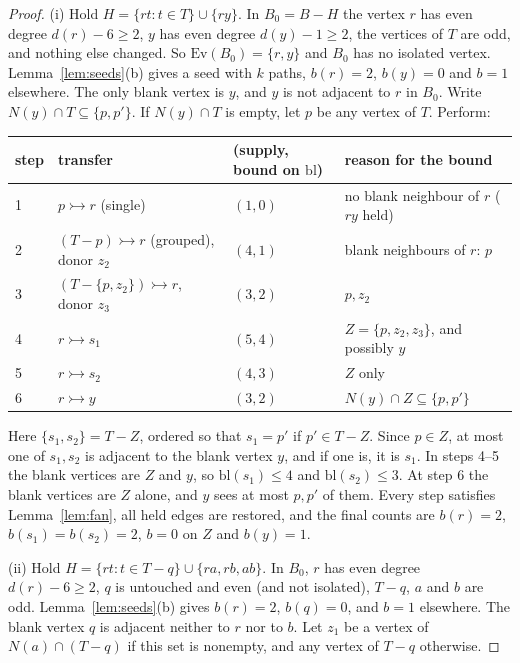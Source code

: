 \documentclass[11pt]{amsart}
\theoremstyle{definition}
\newcommand{\Ev}{\mathrm{Ev}}
\newcommand{\tr}{\rightarrowtail}   %
\newcommand{\bl}{\mathrm{bl}}
\begin{document}
\begin{proof}
(i) Hold $H=\{rt:t\in T\}\cup\{ry\}$. In $B_0=B-H$ the vertex $r$ has even degree $d(r)-6\ge2$, $y$
has even degree $d(y)-1\ge2$, the vertices of $T$ are odd, and nothing else changed. So
$\Ev(B_0)=\{r,y\}$ and $B_0$ has no isolated vertex. Lemma~\ref{lem:seeds}(b) gives a seed with
$k$ paths, $b(r)=2$, $b(y)=0$ and $b=1$ elsewhere. The only blank vertex is $y$, and $y$ is not
adjacent to $r$ in $B_0$. Write $N(y)\cap T\subseteq\{p,p'\}$. If $N(y)\cap T$ is empty, let $p$ be
any vertex of $T$. Perform:

\begin{center}\small
\begin{tabular}{llll}
\toprule
step & transfer & (supply, bound on $\bl$) & reason for the bound\\
\midrule
1 & $p\tr r$ (single) & $(1,0)$ & no blank neighbour of $r$ ($ry$ held)\\
2 & $(T-p)\tr r$ (grouped), donor $z_2$ & $(4,1)$ & blank neighbours of $r$: $p$\\
3 & $(T-\{p,z_2\})\tr r$, donor $z_3$ & $(3,2)$ & $p,z_2$\\
4 & $r\tr s_1$ & $(5,4)$ & $Z=\{p,z_2,z_3\}$, and possibly $y$\\
5 & $r\tr s_2$ & $(4,3)$ & $Z$ only\\
6 & $r\tr y$ & $(3,2)$ & $N(y)\cap Z\subseteq\{p,p'\}$\\
\bottomrule
\end{tabular}
\end{center}

Here $\{s_1,s_2\}=T-Z$, ordered so that $s_1=p'$ if $p'\in T-Z$. Since $p\in Z$, at most one of
$s_1,s_2$ is adjacent to the blank vertex $y$, and if one is, it is $s_1$. In steps 4--5 the blank
vertices are $Z$ and $y$, so $\bl(s_1)\le4$ and $\bl(s_2)\le3$. At step 6 the blank vertices are
$Z$ alone, and $y$ sees at most $p,p'$ of them. Every step satisfies Lemma~\ref{lem:fan}, all held
edges are restored, and the final counts are $b(r)=2$, $b(s_1)=b(s_2)=2$, $b=0$ on $Z$ and $b(y)=1$.

(ii) Hold $H=\{rt:t\in T-q\}\cup\{ra,rb,ab\}$. In $B_0$, $r$ has even degree $d(r)-6\ge2$, $q$ is
untouched and even (and not isolated), $T-q$, $a$ and $b$ are odd. Lemma~\ref{lem:seeds}(b) gives $b(r)=2$, $b(q)=0$,
and $b=1$ elsewhere. The blank vertex $q$ is adjacent neither to $r$ nor to $b$. Let $z_1$ be a
vertex of $N(a)\cap(T-q)$ if this set is nonempty, and any vertex of $T-q$ otherwise.


\end{proof}
\end{document}
